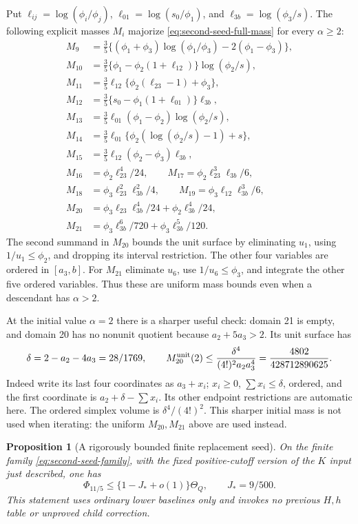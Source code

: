 \documentclass[11pt]{article}
\newtheorem{proposition}[theorem]{Proposition}
\begin{document}
Put $\ell_{ij}=\log(\phi_i/\phi_j)$,
$\ell_{01}=\log(s_0/\phi_1)$, and
$\ell_{3b}=\log(\phi_3/s)$.
The following explicit masses $M_i$ majorize
\eqref{eq:second-seed-full-mass} for every $\alpha\ge2$:
\begin{align*}
 M_9&=\tfrac35\{(\phi_1+\phi_3)\log(\phi_1/\phi_3)-2(\phi_1-\phi_3)\},\\
 M_{10}&=\tfrac35\{\phi_1-\phi_2(1+\ell_{12})\}\log(\phi_2/s),\\
 M_{11}&=\tfrac35\ell_{12}\{\phi_2(\ell_{23}-1)+\phi_3\},\\
 M_{12}&=\tfrac35\{s_0-\phi_1(1+\ell_{01})\}\ell_{3b},\\
 M_{13}&=\tfrac35\ell_{01}(\phi_1-\phi_2)\log(\phi_2/s),\\
 M_{14}&=\tfrac35\ell_{01}\{\phi_2(\log(\phi_2/s)-1)+s\},\\
 M_{15}&=\tfrac35\ell_{12}(\phi_2-\phi_3)\ell_{3b},\\
 M_{16}&=\phi_2\ell_{23}^4/24,\qquad
 M_{17}=\phi_2\ell_{23}^3\ell_{3b}/6,\\
 M_{18}&=\phi_3\ell_{23}^2\ell_{3b}^2/4,\qquad
 M_{19}=\phi_3\ell_{12}\ell_{3b}^3/6,\\
 M_{20}&=\phi_3\ell_{23}\ell_{3b}^4/24
                         +\phi_2\ell_{3b}^4/24,\\
 M_{21}&=\phi_3\ell_{3b}^6/720+\phi_3\ell_{3b}^5/120.
\end{align*}
The second summand in $M_{20}$ bounds the unit surface by eliminating
$u_1$, using $1/u_1\le\phi_2$, and dropping its interval restriction.
The other four variables are ordered in $[a_3,b]$.
For $M_{21}$ eliminate $u_6$, use $1/u_6\le\phi_3$, and integrate
the other five ordered variables.  Thus these are uniform mass bounds
even when a descendant has $\alpha>2$.

At the initial value $\alpha=2$ there is a sharper useful check:
domain 21 is empty, and domain 20 has no nonunit quotient because
$a_2+5a_3>2$.  Its unit surface has
\[
 \delta=2-a_2-4a_3=28/1769,\qquad
 M_{20}^{\rm unit}(2)\le
 \frac{\delta^4}{(4!)^2a_2a_3^4}
 =\frac{4802}{428712890625}.
\]
Indeed write its last four coordinates as $a_3+x_i$;
$x_i\ge0$, $\sum x_i\le\delta$, ordered, and the first coordinate
is $a_2+\delta-\sum x_i$.  Its other endpoint restrictions are
automatic here.  The ordered simplex volume is $\delta^4/(4!)^2$.
This sharper initial mass is not used when iterating: the uniform
$M_{20},M_{21}$ above are used instead.

\begin{proposition}[A rigorously bounded finite replacement seed]
\label{prop:replacement-second-seed}
On the finite family \eqref{eq:second-seed-family}, with the fixed
positive-cutoff version of the $K$ input just described, one has
\[
 \Phi_{11/5}\le\{1-J_*+o(1)\}\Theta_Q,
 \qquad J_*=9/500.
\]
This statement uses ordinary lower baselines only and invokes no
previous $H,h$ table or unproved child correction.
\end{proposition}
\end{document}
